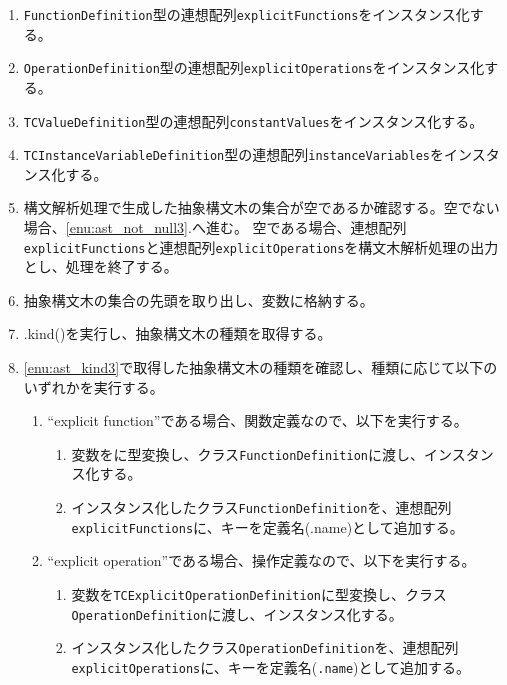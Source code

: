 \documentclass[uplatex, report, a4j, 10pt]{jsbook}
\newcommand\ttt[1]{\texttt{#1}}
\begin{document}
\begin{enumerate}
  \item \ttt{FunctionDefinition}型の連想配列\ttt{explicitFunctions}をインスタンス化する。
  \item \ttt{OperationDefinition}型の連想配列\ttt{explicitOperations}をインスタンス化する。
  \item \ttt{TCValueDefinition}型の連想配列\ttt{constantValues}をインスタンス化する。
  \item \ttt{TCInstanceVariableDefinition}型の連想配列\ttt{instanceVariables}をインスタンス化する。
  \item\label{enu:checkAstIsNull3} 構文解析処理で生成した抽象構文木の集合が空であるか確認する。空でない場合、\ref{enu:ast_not_null3}.へ進む。
        空である場合、連想配列\ttt{explicitFunctions}と連想配列\ttt{explicitOperations}を構文木解析処理の出力とし、処理を終了する。
  \item\label{enu:ast_not_null3} 抽象構文木の集合の先頭を取り出し、変数\astDefinition{}に格納する。
  \item\label{enu:ast_kind3} \astDefinition{}.kind()を実行し、抽象構文木の種類を取得する。
  \item \ref{enu:ast_kind3}で取得した抽象構文木の種類を確認し、種類に応じて以下のいずれかを実行する。
        \begin{enumerate}
          \item ``explicit function''である場合、関数定義なので、以下を実行する。
                \begin{enumerate}
                  \item 変数\astDefinition{}を\TCExplicitFunctionDefinition{}に型変換し、クラス\ttt{FunctionDefinition}に渡し、インスタンス化する。
                  \item インスタンス化したクラス\ttt{FunctionDefinition}を、連想配列\ttt{explicitFunctions}に、キーを定義名(\astDefinition{}.name)として追加する。
                \end{enumerate}
          \item ``explicit operation''である場合、操作定義なので、以下を実行する。
                \begin{enumerate}
                  \item 変数\astDefinition{}を\ttt{TCExplicitOperationDefinition}に型変換し、クラス\ttt{OperationDefinition}に渡し、インスタンス化する。
                  \item インスタンス化したクラス\ttt{OperationDefinition}を、連想配列\ttt{explicitOperations}に、キーを定義名(\astDefinition{}\ttt{.name})として追加する。

\end{enumerate}
\end{enumerate}
\end{enumerate}
\end{document}
